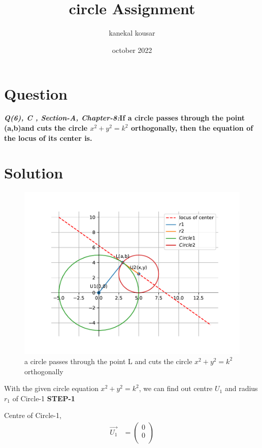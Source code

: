 \documentclass[journal,12pt,twocolumn]{IEEEtran}
\begin{document}
\title{\textbf{\\circle Assignment}}
\author{kanekal kousar}
\date{october 2022}

\maketitle


\section{Question}
\textbf{\textit{Q(6), C , Section-A, Chapter-8:}If a circle passes through the point (a,b)and cuts the circle {$x^2+y^2=k^2$} orthogonally, then the equation of the locus of its center is.}

\section{Solution}
\raggedright 

\begin{figure}[h!]
\centering
\includegraphics[scale=0.6]{code/cir.pdf}  
\centering
\caption{a circle passes through the point L and cuts the circle {$x^2+y^2=k^2$} orthogonally}
\end{figure}

\vspace{0.25cm}
With the given circle equation {$x^2+y^2=k^2$}, we can find out centre \(U_1\) and radius \(r_1\) of Circle-1
\vspace{0.25cm}
\textbf{STEP-1}

Centre of Circle-1,
\boldmath 
\begin{align} 
\vec{U_1} &= \begin{pmatrix}0 \\ 0 \\ \end{pmatrix} 
\end{align}
\unboldmath
\end{document}
